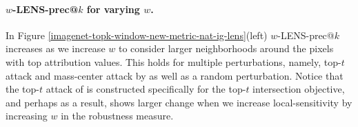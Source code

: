 \documentclass[letterpaper]{article} %
\begin{document}
\paragraph{$w$-LENS-prec@$k$ for varying $w$.} In Figure \ref{imagenet-topk-window-new-metric-nat-ig-lens}(left) $w$-LENS-prec@$k$ increases as we increase $w$ to consider larger neighborhoods around the pixels with top attribution values. This holds for multiple perturbations, namely, top-$t$ attack and mass-center attack by \citet{ghorbani2018interpretation} as well as a random perturbation. Notice that the top-$t$ attack of \citet{ghorbani2018interpretation} is constructed specifically for the top-$t$ intersection objective, and perhaps as a result, shows larger change when we increase local-sensitivity by increasing $w$ in the robustness measure. %
\end{document}
